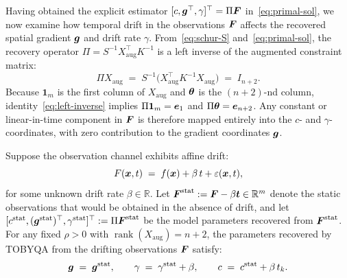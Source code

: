 Having obtained the explicit estimator $[c, \boldsymbol{g}^\top, \gamma]^\top = \Pi \boldsymbol{F}$ in~\eqref{eq:primal-sol}, we now examine how temporal drift in the observations $\boldsymbol{F}$ affects the recovered spatial gradient $\boldsymbol{g}$ and drift rate $\gamma$. From~\eqref{eq:schur-S} and~\eqref{eq:primal-sol}, the recovery operator $\Pi = S^{-1} X_{\mathrm{aug}}^\top K^{-1}$ is a left inverse of the augmented constraint matrix:
\begin{equation}\label{eq:left-inverse}
  \Pi X_{\mathrm{aug}} \;=\; S^{-1} \bigl(X_{\mathrm{aug}}^\top K^{-1} X_{\mathrm{aug}}\bigr) \;=\; I_{n+2}.
\end{equation}
Because $\mathbf{1}_m$ is the first column of $X_{\mathrm{aug}}$ and $\boldsymbol{\theta}$ is the $(n+2)$-nd column, identity~\eqref{eq:left-inverse} implies $\Pi \mathbf{1}_m = \boldsymbol{e}_1$ and $\Pi \boldsymbol{\theta} = \boldsymbol{e}_{n+2}$. Any constant or linear-in-time component in $\boldsymbol{F}$ is therefore mapped entirely into the $c$- and $\gamma$-coordinates, with zero contribution to the gradient coordinates $\boldsymbol{g}$.

\begin{theorem}
\label{thm:exact-decoupling}
Suppose the observation channel exhibits affine drift:
\begin{equation*}
  F(\boldsymbol{x}, t) \;=\; f(\boldsymbol{x}) + \beta\,t + \varepsilon(\boldsymbol{x},t),
\end{equation*}
for some unknown drift rate $\beta \in \mathbb{R}$. Let $\boldsymbol{F}^{\mathrm{stat}} := \boldsymbol{F} - \beta \boldsymbol{t} \in \mathbb{R}^m$ denote the static observations that would be obtained in the absence of drift, and let $[c^{\mathrm{stat}}, (\boldsymbol{g}^{\mathrm{stat}})^\top, \gamma^{\mathrm{stat}}]^\top := \Pi \boldsymbol{F}^{\mathrm{stat}}$ be the model parameters recovered from $\boldsymbol{F}^{\mathrm{stat}}$. For any fixed $\rho > 0$ with $\operatorname{rank}(X_{\mathrm{aug}}) = n+2$, the parameters recovered by TOBYQA from the drifting observations $\boldsymbol{F}$ satisfy:
\begin{equation}\label{eq:decoupling-identity}
  \boldsymbol{g} \;=\; \boldsymbol{g}^{\mathrm{stat}},
  \qquad
  \gamma \;=\; \gamma^{\mathrm{stat}} + \beta,
  \qquad
  c \;=\; c^{\mathrm{stat}} + \beta\,t_k.
\end{equation}
\end{theorem}

